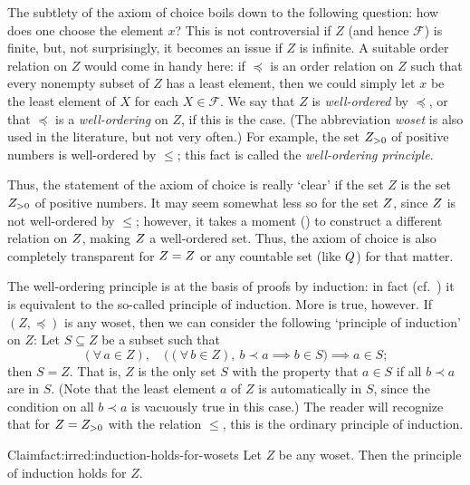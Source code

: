 The subtlety of the axiom of choice boils down to the following
question: how does one choose the element $x$? This is not
controversial if $Z$ (and hence $\mathscr{F}$) is finite, but, not
surprisingly, it becomes an issue if $Z$ is infinite. A suitable order
relation on $Z$ would come in handy here: if $\preceq$ is an order
relation on $Z$ such that every nonempty subset of $Z$ has a least
element, then we could simply let $x$ be the least element of $X$ for
each $X \in \mathscr{F}$. We say that $Z$ is \emph{well-ordered} by
$\preceq$, or that $\preceq$ is a \emph{well-ordering} on $Z$, if this
is the case. (The abbreviation \emph{woset} is also used in the
literature, but not very often.) For example, the set $Z_{>0}$ of
positive numbers is well-ordered by $\leq$; this fact is called the
\emph{well-ordering principle}.

Thus, the statement of the axiom of choice is really `clear' if the
set $Z$ is the set $Z_{>0}$ of positive numbers. It may seem somewhat
less so for the set $Z$, since $Z$ is not well-ordered by $\leq$;
however, it takes a moment
() to construct a
different relation on $Z$, making $Z$ a well-ordered set. Thus, the
axiom of choice is also completely transparent for $Z = Z$ or any
countable set (like $Q$) for that matter.

The well-ordering principle is at the basis of proofs by induction: in
fact (cf.\ )
it is equivalent to the so-called principle of induction. More is
true, however. If $(Z, \preceq)$ is any woset, then we can consider
the following `principle of induction' on $Z$: Let $S \subseteq Z$ be
a subset such that
\[(\forall\, a \in Z),\quad \bigl((\forall\, b \in Z),\ b \prec a
  \implies b \in S\bigr) \implies a \in S;\] then $S = Z$. That is,
$Z$ is the only set $S$ with the property that $a \in S$ if all
$b \prec a$ are in $S$. (Note that the least element $a$ of $Z$ is
automatically in $S$, since the condition on all $b \prec a$ is
vacuously true in this case.) The reader will recognize that for
$Z = Z_{>0}$ with the relation $\leq$, this is the ordinary principle
of induction.

\begin{fact}{Claim}{fact:irred:induction-holds-for-wosets}
  Let $Z$ be any woset. Then the principle of induction holds for $Z$.
\end{fact}

